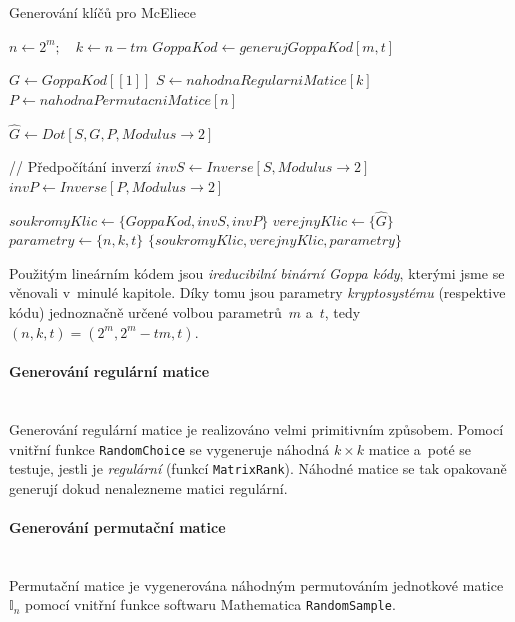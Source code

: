 \documentclass[thesis=M,czech,hidelinks]{FITthesis}[2012/06/26]
\newcommand{\0}{{\textcolor[gray]{0.75}{0}}}
\newenvironment{algoritmus}{
    \floatname{algorithm}{Algoritmus}
    \begin{algorithm}
}{\end{algorithm}}
\begin{document}
\begin{algoritmus}[!ht]
    \caption{Generování klíčů pro McEliece}
    \begin{algorithmic}[1]
        \State $ n \gets 2^m ; \quad k \gets n - tm $
        \State $ GoppaKod \gets generujGoppaKod[ m, t ] $

        \hfil

        \State $ G \gets GoppaKod[[1]] $
        \State $ S \gets nahodnaRegularniMatice[k] $
        \State $ P \gets nahodnaPermutacniMatice[n] $

        \hfil
        \State $ \hat{G} \gets Dot[ S, G, P, Modulus\to2 ] $

        // Předpočítání inverzí
        \State $ invS \gets Inverse[ S, Modulus\to2 ] $
        \State $ invP \gets Inverse[ P, Modulus\to2 ] $

        \hfil
        \State $ soukromyKlic \gets \{ GoppaKod, invS, invP \} $
        \State $ verejnyKlic  \gets \{ \hat{G} \} $
        \State $ parametry    \gets \{ n, k, t \} $
        \State \Return $ \{ soukromyKlic, verejnyKlic, parametry \} $
     \EndFunction
    \end{algorithmic}
\end{algoritmus}

Použitým lineárním kódem jsou \emph{ireducibilní binární Goppa kódy}, kterými
jsme se věnovali v~minulé kapitole. Díky tomu jsou parametry
\emph{kryptosystému} (respektive kódu) jednoznačně určené volbou parametrů~$m$
a~$t$, tedy $(n,k,t) = (2^m, 2^m - tm, t)$.


\paragraph{Generování regulární matice} \hfil \\
Generování regulární matice je realizováno velmi primitivním způsobem. Pomocí
vnitřní funkce \texttt{RandomChoice} se vygeneruje náhodná $k \times k$ matice
a~poté se testuje, jestli je \emph{regulární} (funkcí \texttt{MatrixRank}).
Náhodné matice se tak opakovaně generují dokud nenalezneme matici regulární.


\paragraph{Generování permutační matice} \hfil \\
Permutační matice je vygenerována náhodným permutováním jednotkové
matice~$\mathbb{I}_n$ pomocí vnitřní funkce softwaru Mathematica
\texttt{RandomSample}.
\end{document}
